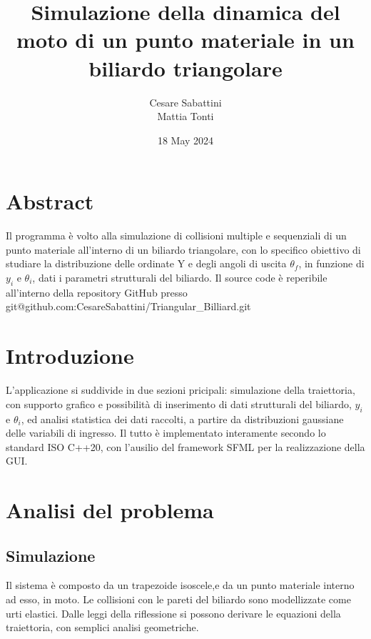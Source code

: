 \documentclass{article}
\title{Simulazione della dinamica del moto di un punto materiale in un biliardo triangolare}
\author{Cesare Sabattini\\ Mattia Tonti}
\date{18 May 2024}
\begin{document}
\maketitle

\section*{Abstract}
Il programma è volto alla simulazione di collisioni multiple e sequenziali di un punto materiale all'interno 
di un biliardo triangolare, con lo specifico obiettivo di studiare la distribuzione delle ordinate Y e degli angoli di uscita \(\theta_f\), in funzione di \(y_i\) e \(\theta_i\), dati i parametri strutturali del biliardo.
Il source code è reperibile all'interno della repository GitHub presso git@github.com:CesareSabattini/Triangular\_Billiard.git

\section{Introduzione}
L'applicazione si suddivide in due sezioni pricipali: simulazione della traiettoria, con supporto grafico e possibilità di inserimento di dati strutturali del biliardo,  \(y_i\) e \(\theta_i\), ed analisi statistica dei dati raccolti, a partire da distribuzioni gaussiane delle variabili di ingresso.
Il tutto è implementato interamente secondo lo standard ISO C++20, con l'ausilio del framework SFML per la realizzazione della GUI.

\section{Analisi del problema}
\subsection{Simulazione}
Il sistema è composto da un trapezoide isoscele,e da un punto materiale interno ad esso, in moto. Le collisioni con le pareti del biliardo sono modellizzate come urti elastici.
Dalle leggi della riflessione si possono derivare le equazioni della traiettoria, con semplici analisi geometriche.
\end{document}
